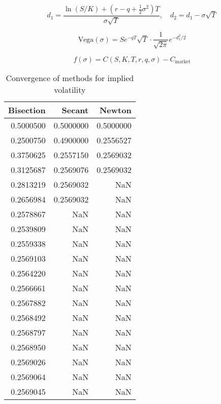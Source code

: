 \documentclass{article}
\begin{document}
\[
    d_1 = \frac{\ln(S/K) + (r - q + \frac{1}{2}\sigma^2)T}{\sigma \sqrt{T}}, \quad
    d_2 = d_1 - \sigma \sqrt{T}
\]

\[
    \text{Vega}(\sigma) = S e^{-qT} \sqrt{T} \cdot \frac{1}{\sqrt{2\pi}} e^{-d_1^2 / 2}
\]

\[
    f(\sigma) = C(S, K, T, r, q, \sigma) - C_{\text{market}}
\]


\begin{table}
    \caption{Convergence of methods for implied volatility}
    \label{tab:implied_volatility_convergence}
    \begin{tabular}{rrr}
        \toprule
        Bisection & Secant    & Newton    \\
        \midrule
        0.5000500 & 0.5000000 & 0.5000000 \\
        0.2500750 & 0.4900000 & 0.2556527 \\
        0.3750625 & 0.2557150 & 0.2569032 \\
        0.3125687 & 0.2569076 & 0.2569032 \\
        0.2813219 & 0.2569032 & NaN       \\
        0.2656984 & 0.2569032 & NaN       \\
        0.2578867 & NaN       & NaN       \\
        0.2539809 & NaN       & NaN       \\
        0.2559338 & NaN       & NaN       \\
        0.2569103 & NaN       & NaN       \\
        0.2564220 & NaN       & NaN       \\
        0.2566661 & NaN       & NaN       \\
        0.2567882 & NaN       & NaN       \\
        0.2568492 & NaN       & NaN       \\
        0.2568797 & NaN       & NaN       \\
        0.2568950 & NaN       & NaN       \\
        0.2569026 & NaN       & NaN       \\
        0.2569064 & NaN       & NaN       \\
        0.2569045 & NaN       & NaN       \\
        \bottomrule
    \end{tabular}
\end{table}
\end{document}
